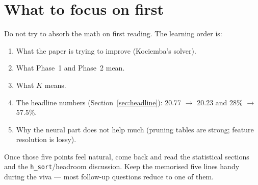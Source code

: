 \documentclass[11pt,a4paper]{article}
\begin{document}
\section{What to focus on first}

Do not try to absorb the math on first reading. The learning order is:

\begin{enumerate}[leftmargin=2em]
  \item What the paper is trying to improve (Kociemba's solver).
  \item What Phase~1 and Phase~2 mean.
  \item What $K$ means.
  \item The headline numbers (Section~\ref{sec:headline}): 20.77 $\to$
        20.23 and 28\% $\to$ 57.5\%.
  \item Why the neural part does not help much (pruning tables are
        strong; feature resolution is lossy).
\end{enumerate}

Once those five points feel natural, come back and read the
statistical sections and the \texttt{h\_sort}/headroom discussion. Keep
the memorised five lines handy during the viva --- most follow-up
questions reduce to one of them.
\end{document}
